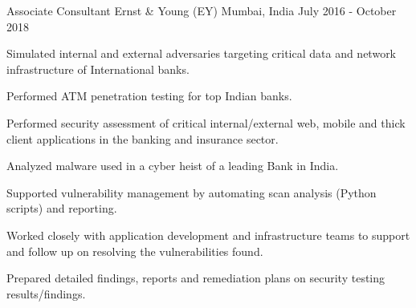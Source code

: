 \begin{cventries}
  \cventry
    {Associate Consultant} %
    {Ernst \& Young (EY)} %
    {Mumbai, India} %
    {July 2016 - October 2018} %
    {
      \begin{cvitems} %
        \item{Simulated internal and external adversaries targeting critical data and network infrastructure of International banks.}
        \item{Performed ATM penetration testing for top Indian banks.}
        \item{Performed security assessment of critical internal/external web, mobile and thick client applications in the banking and insurance sector.}
        \item{Analyzed malware used in a cyber heist of a leading Bank in India.}
        \item{Supported vulnerability management by automating scan analysis (Python scripts) and reporting.}
        \item{Worked closely with application development and infrastructure teams to support and follow up on resolving the vulnerabilities found.}
        \item{Prepared detailed findings, reports and remediation plans on security testing results/findings.}
      \end{cvitems}
    }

\end{cventries}